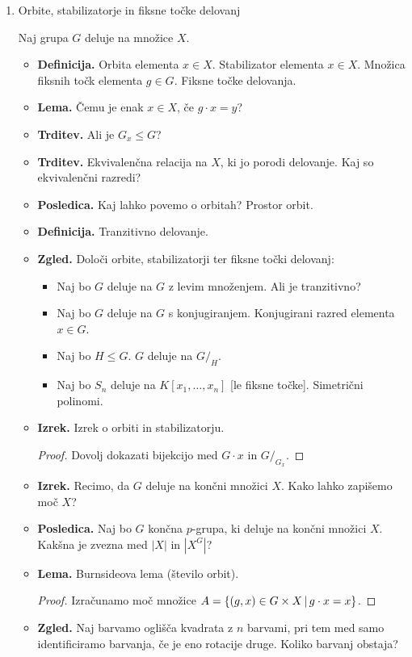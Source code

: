 \begin{enumerate}
    \item Orbite, stabilizatorje in fiksne točke delovanj
    
    Naj grupa \(G\) deluje na množice \(X\).
    \begin{itemize}
        \item \textbf{Definicija.} Orbita elementa \(x \in X\). Stabilizator elementa \(x \in X\). Množica fiksnih točk elementa \(g \in G\). Fiksne točke delovanja.
        \item \textbf{Lema.} Čemu je enak \(x \in X\), če \(g \cdot x = y\)?
        \item \textbf{Trditev.} Ali je \(G_x \leq G\)?
        \item \textbf{Trditev.} Ekvivalenčna relacija na \(X\), ki jo porodi delovanje. Kaj so ekvivalenčni razredi?
        \item \textbf{Posledica.} Kaj lahko povemo o orbitah? Prostor orbit.
        \item \textbf{Definicija.} Tranzitivno delovanje.
        \item \textbf{Zgled.} Določi orbite, stabilizatorji ter fiksne točki delovanj:
        \begin{itemize}
            \item Naj bo \(G\) deluje na \(G\) z levim množenjem. Ali je tranzitivno?
            \item Naj bo \(G\) deluje na \(G\) s konjugiranjem. Konjugirani razred elementa \(x \in G\).
            \item Naj bo \(H \leq G\). \(G\) deluje na \(G/_H\).
            \item Naj bo \(S_n\) deluje na \(K[x_1, \ldots, x_n]\) [le fiksne točke]. Simetrični polinomi.
        \end{itemize}
        \item \textbf{Izrek.} Izrek o orbiti in stabilizatorju. \todo{*}
        \begin{proof}
            Dovolj dokazati bijekcijo med \(G \cdot x\) in \(G/_{G_x}\).
        \end{proof}
        \item \textbf{Izrek.} Recimo, da \(G\) deluje na končni množici \(X\). Kako lahko zapišemo moč \(X\)?
        \item \textbf{Posledica.} Naj bo \(G\) končna \(p\)-grupa, ki deluje na končni množici \(X\). Kakšna je zvezna med \(|X|\) in \(|X^G|\)?
        \newpage
        \item \textbf{Lema.} Burnsideova lema (število orbit).
        \begin{proof}
            Izračunamo moč množice \(A = \{(g, x) \in G \times X \,|\, g \cdot x = x\}\).
        \end{proof}
        \item \textbf{Zgled.} Naj barvamo oglišča kvadrata z \(n\) barvami, pri tem med samo identificiramo barvanja, če je eno rotacije druge. Koliko barvanj obstaja?
    \end{itemize}


\end{enumerate}
